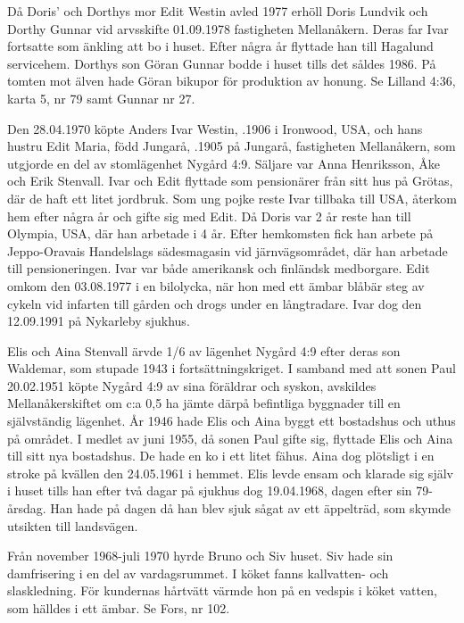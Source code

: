 Då Doris' och Dorthys mor Edit Westin avled 1977 erhöll Doris Lundvik och Dorthy Gunnar vid arvsskifte 01.09.1978 fastigheten Mellanåkern. Deras far Ivar fortsatte som änkling att bo i huset. Efter några år flyttade han till Hagalund servicehem. Dorthys son Göran Gunnar bodde i huset tills det såldes 1986. På tomten mot älven hade Göran bikupor för produktion av honung. Se Lilland 4:36, karta 5, nr 79 samt Gunnar nr 27.


Den 28.04.1970 köpte Anders Ivar Westin, .1906 i Ironwood, USA, och hans hustru Edit Maria, född Jungarå, .1905 	på Jungarå,	fastigheten Mellanåkern, som utgjorde en del av stomlägenhet Nygård 4:9. Säljare var Anna Henriksson, Åke och Erik Stenvall. Ivar och Edit flyttade som pensionärer från sitt hus på Grötas, där de haft ett litet jordbruk. Som ung pojke reste Ivar tillbaka till USA, återkom hem efter några år och gifte sig med Edit. Då Doris var 2 år reste han till Olympia, USA, där han arbetade i 4 år. Efter hemkomsten fick han arbete på Jeppo-Oravais Handelslags sädesmagasin vid järnvägsområdet, där han arbetade till pensioneringen. Ivar var både amerikansk och finländsk medborgare. Edit omkom den 03.08.1977 i en bilolycka, när hon med ett ämbar blåbär steg av cykeln vid infarten till gården och drogs under en långtradare. Ivar dog den 12.09.1991 på Nykarleby sjukhus.


Elis och Aina Stenvall ärvde 1/6 av lägenhet Nygård 4:9 efter deras son Waldemar, som stupade 1943 i fortsättningskriget. I samband med att sonen Paul 20.02.1951 köpte Nygård 4:9 av sina föräldrar och syskon, avskildes Mellanåkerskiftet om c:a 0,5 ha jämte därpå befintliga byggnader till en självständig lägenhet. År 1946 hade Elis och Aina byggt ett bostadshus och uthus på området. I medlet av juni 1955, då sonen Paul gifte sig, flyttade Elis och Aina till sitt nya bostadshus. De hade en ko i ett litet fähus. Aina dog plötsligt i en stroke på kvällen den 	24.05.1961 i hemmet. Elis levde ensam och klarade sig själv i huset tills han efter två dagar på sjukhus dog 19.04.1968, dagen efter sin 79-årsdag. Han hade på dagen då han blev sjuk sågat av ett äppelträd,	som skymde utsikten till landsvägen.



Från november 1968-juli 1970 hyrde Bruno och Siv  huset. Siv hade sin damfrisering i en del av vardagsrummet. I köket fanns kallvatten- och slaskledning. För kundernas hårtvätt värmde hon på en	vedspis i köket vatten, som hälldes i ett ämbar. Se Fors, nr 102.

